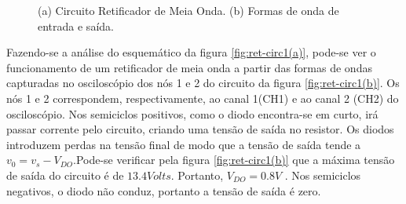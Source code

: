 \documentclass[a4paper]{article} %
\begin{document}
\begin{figure}[h!]
\begin{centering}
\subfloat[]{

 \label{fig:ret-circ1(a)}
}

\par\end{centering}
\caption{(a) Circuito Retificador de Meia Onda. (b)  Formas de onda de entrada e saída. \label{fig:ret-circ1}}
\end{figure}

\newpage
          Fazendo-se a análise do esquemático da figura  \ref{fig:ret-circ1(a)}, pode-se ver o funcionamento de um retificador de meia onda a partir das formas de ondas capturadas no osciloscópio dos nós 1 e 2 do circuito da figura  \ref{fig:ret-circ1(b)}. Os nós 1 e 2 correspondem, respectivamente, ao canal 1(CH1) e ao canal 2 (CH2) do osciloscópio. Nos semiciclos positivos, como o diodo encontra-se em curto, irá passar corrente pelo circuito, criando uma tensão de saída no resistor. Os diodos introduzem perdas na tensão final de modo que a tensão de saída tende a $v_0=v_s-V_{DO}$.Pode-se verificar pela figura  \ref{fig:ret-circ1(b)} que a máxima tensão de saída do circuito é de   $13.4 Volts$. Portanto,    $V_{DO}= 0.8V $ . Nos semiciclos negativos, o diodo não conduz, portanto a tensão de saída é zero.
    
\end{document}
